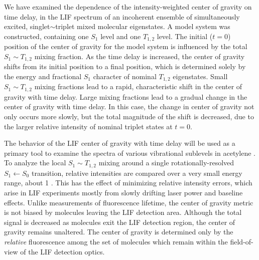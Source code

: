 \documentclass[12pt]{mitthesis}
\begin{document}
We have examined the dependence of the intensity-weighted center of
gravity on time delay, in the LIF spectrum of an incoherent ensemble
of simultaneously excited, singlet$\sim$triplet mixed molecular
eigenstates.  A model system was constructed, containing one $S_1$
level and one $T_{1,2}$ level.  The initial ($t=0$) position of the
center of gravity for the model system is influenced by the total $S_1
\sim T_{1,2}$ mixing fraction.  As the time delay is increased, the
center of gravity shifts from its initial position to a final
position, which is determined solely by the energy and fractional
$S_1$ character of nominal $T_{1,2}$ eigenstates.  Small $S_1 \sim
T_{1,2}$ mixing fractions lead to a rapid, characteristic shift in the
center of gravity with time delay.  Large mixing fractions lead to a
gradual change in the center of gravity with time delay.  In this
case, the change in center of gravity not only occurs more slowly, but
the total magnitude of the shift is decreased, due to the larger
relative intensity of nominal triplet states at $t=0$.

The behavior of the LIF center of gravity with time delay will be used
as a primary tool to examine the spectra of various vibrational
sublevels in acetylene \astate.  To analyze the local $S_1 \sim
T_{1,2}$ mixing around a single rotationally-resolved $S_1 \leftarrow
S_0$ transition, relative intensities are compared over a very small
energy range, about 1 \rcm.  This has the effect of minimizing
relative intensity errors, which arise in LIF experiments mostly from
slowly drifting laser power and baseline effects.  Unlike measurements
of fluorescence lifetime, the center of gravity metric is not biased
by molecules leaving the LIF detection area.  Although the total
signal is decreased as molecules exit the LIF detection region, the
center of gravity remains unaltered.  The center of gravity is
determined only by the \emph{relative} fluorescence among the set of
molecules which remain within the field-of-view of the LIF detection
optics.
\end{document}
